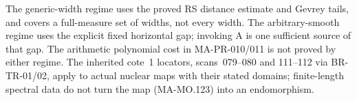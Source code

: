 The generic-width regime uses the proved RS distance
estimate and Gevrey tails, and covers a full-measure
set of widths, not every width. The arbitrary-smooth
regime uses the explicit fixed horizontal gap; invoking
A is one sufficient source of that gap. The arithmetic
polynomial cost in MA-PR-010/011 is not proved by either
regime. The inherited cote~1 locators, scans~079--080 and
111--112 via BR-TR-01/02, apply to actual nuclear maps
with their stated domains; finite-length spectral data
do not turn the map (MA-MO.123) into an endomorphism.
